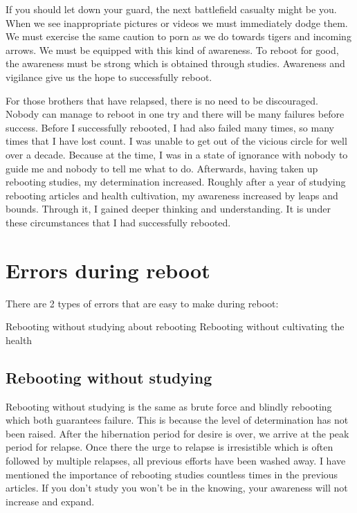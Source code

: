 \documentclass[
]{book}
\begin{document}
If you should let down your guard, the next battlefield casualty might be you. When we see inappropriate pictures or videos we must immediately dodge them. We must exercise the same caution to porn as we do towards tigers and incoming arrows. We must be equipped with this kind of awareness. To reboot for good, the awareness must be strong which is obtained through studies. Awareness and vigilance give us the hope to successfully reboot.

For those brothers that have relapsed, there is no need to be discouraged. Nobody can manage to reboot in one try and there will be many failures before success. Before I successfully rebooted, I had also failed many times, so many times that I have lost count. I was unable to get out of the vicious circle for well over a decade. Because at the time, I was in a state of ignorance with nobody to guide me and nobody to tell me what to do. Afterwards, having taken up rebooting studies, my determination increased. Roughly after a year of studying rebooting articles and health cultivation, my awareness increased by leaps and bounds. Through it, I gained deeper thinking and understanding. It is under these circumstances that I had successfully rebooted.

\hypertarget{errors-during-reboot}{%
\section{Errors during reboot}\label{errors-during-reboot}}

There are 2 types of errors that are easy to make during reboot:

Rebooting without studying about rebooting
Rebooting without cultivating the health

\hypertarget{rebooting-without-studying}{%
\subsection{Rebooting without studying}\label{rebooting-without-studying}}

Rebooting without studying is the same as brute force and blindly rebooting which both guarantees failure. This is because the level of determination has not been raised. After the hibernation period for desire is over, we arrive at the peak period for relapse. Once there the urge to relapse is irresistible which is often followed by multiple relapses, all previous efforts have been washed away. I have mentioned the importance of rebooting studies countless times in the previous articles. If you don't study you won't be in the knowing, your awareness will not increase and expand.
\end{document}

